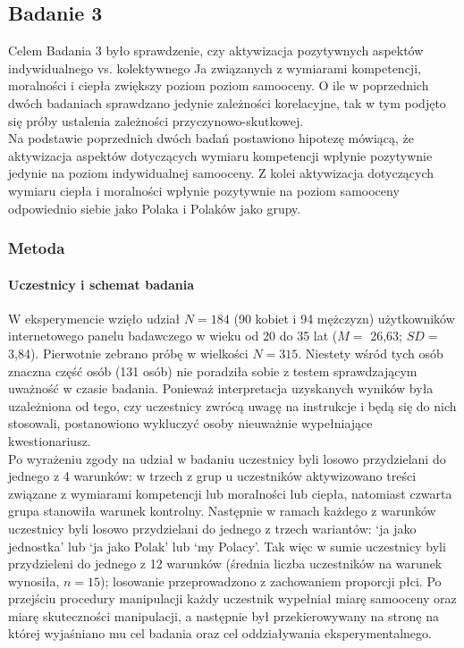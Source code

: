 \documentclass[man]{apa6}
\begin{document}
\newpage
\subsection{Badanie 3}
Celem Badania 3 było sprawdzenie, czy aktywizacja pozytywnych aspektów indywidualnego vs. kolektywnego Ja związanych z wymiarami kompetencji, moralności i ciepła zwiększy poziom poziom samooceny. O ile w poprzednich dwóch badaniach sprawdzano jedynie zależności korelacyjne, tak w tym podjęto się próby ustalenia zależności przyczynowo-skutkowej. \\

Na podstawie poprzednich dwóch badań postawiono hipotezę mówiącą, że aktywizacja aspektów dotyczących wymiaru kompetencji wpłynie pozytywnie jedynie na poziom indywidualnej samooceny. Z kolei aktywizacja dotyczących wymiaru ciepła i moralności wpłynie pozytywnie na poziom samooceny odpowiednio siebie jako Polaka i Polaków jako grupy. \\

\subsubsection{Metoda}

\paragraph{Uczestnicy i schemat badania}
W eksperymencie wzięło udział $N = 184$ (90 kobiet i 94 mężczyzn) użytkowników internetowego panelu badawczego w wieku od 20 do 35 lat ($M =$ 26,63; $SD =$ 3,84). Pierwotnie zebrano próbę w wielkości $N = 315$. Niestety wśród tych osób znaczna część osób (131 osób) nie poradziła sobie z testem sprawdzającym uważność w czasie badania. Ponieważ interpretacja uzyskanych wyników była uzależniona od tego, czy uczestnicy zwrócą uwagę na instrukcje i będą się do nich stosowali, postanowiono wykluczyć osoby nieuważnie wypełniające kwestionariusz.\\

Po wyrażeniu zgody na udział w badaniu uczestnicy byli losowo przydzielani do jednego z 4 warunków: w trzech z grup u uczestników aktywizowano treści związane z wymiarami kompetencji lub moralności lub ciepła, natomiast czwarta grupa stanowiła warunek kontrolny. Następnie w ramach każdego z warunków uczestnicy byli losowo przydzielani do jednego z trzech wariantów: `ja jako jednostka' lub `ja jako Polak' lub `my Polacy'. Tak więc w sumie uczestnicy byli przydzieleni do jednego z 12 warunków (średnia liczba uczestników na warunek wynosiła, $n = 15$); losowanie przeprowadzono z zachowaniem proporcji płci. Po przejściu procedury manipulacji każdy uczestnik wypełniał miarę samooceny oraz miarę skuteczności manipulacji, a następnie był przekierowywany na stronę na której wyjaśniano mu cel badania oraz cel oddziaływania eksperymentalnego.
\end{document}
